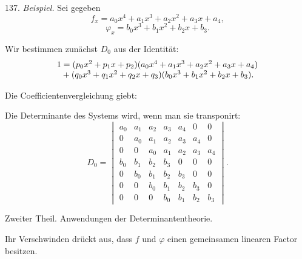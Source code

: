 137. \textit{Beispiel.} Sei gegeben
\[
f_x = a_0x^4+a_1x^3+a_2x^2+a_3x+a_4,
\]
\[
\varphi_x = b_0x^3+b_1x^2+b_2x+b_3.
\]

Wir bestimmen zunächst $D_0$ aus der Identität:
\[
\begin{array}{l}
1 = (p_0x^2+p_1x+p_2)(a_0x^4+a_1x^3+a_2x^2+a_3x+a_4) \\
\hphantom{1} + (q_0x^3+q_1x^2+q_2x+q_3)(b_0x^3+b_1x^2+b_2x+b_3).
\end{array}
\]

Die Coefficientenvergleichung giebt:

Die Determinante des Systems wird, wenn man sie transponirt:
\[
D_0 =
\begin{vmatrix}
a_0 & a_1 & a_2 & a_3 & a_4 & 0 & 0 \\
0 & a_0 & a_1 & a_2 & a_3 & a_4 & 0 \\
0 & 0 & a_0 & a_1 & a_2 & a_3 & a_4 \\
b_0 & b_1 & b_2 & b_3 & 0 & 0 & 0 \\
0 & b_0 & b_1 & b_2 & b_3 & 0 & 0 \\
0 & 0 & b_0 & b_1 & b_2 & b_3 & 0 \\
0 & 0 & 0 & b_0 & b_1 & b_2 & b_3
\end{vmatrix}.
\]



\begin{center}
Zweiter Theil. Anwendungen der Determinantentheorie.
\end{center}

Ihr Verschwinden drückt aus, dass $f$ und $\varphi$ einen gemeinsamen linearen Factor besitzen.

